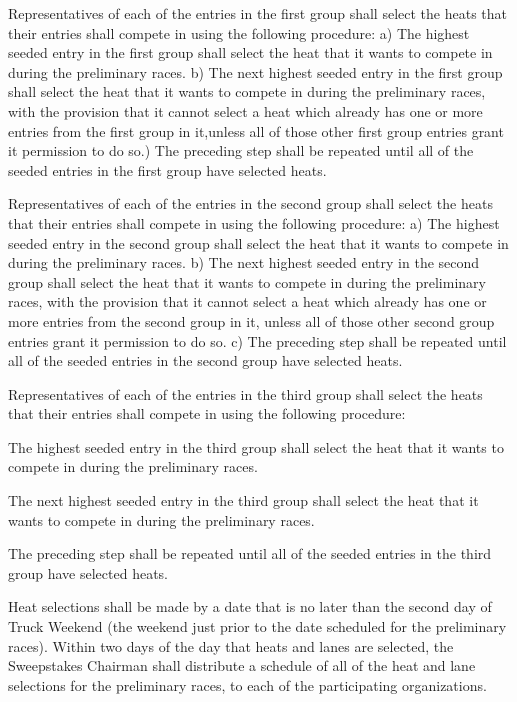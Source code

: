 \documentclass[openany]{book}
\begin{document}
Representatives of each of the entries in the first group shall select the heats that their entries shall compete in using the following procedure: a) The highest seeded entry in the first group shall select the heat that it wants to compete in during the preliminary races. b) The next highest seeded entry in the first group shall select the heat that it wants to compete in during the preliminary races, with the provision that it cannot select a heat which already has one or more entries from the first group in it,unless all of those other first group entries grant it permission to do so.) The preceding step shall be repeated until all of the seeded entries in the first group have selected heats.

Representatives of each of the entries in the second group shall select the heats that their entries shall compete in using the following procedure: a) The highest seeded entry in the second group shall select the heat that it wants to compete in during the preliminary races. b) The next highest seeded entry in the second group shall select the heat that it wants to compete in during the preliminary races, with the provision that it cannot select a heat which already has one or more entries from the second group in it, unless all of those other second group entries grant it permission to do so. c) The preceding step shall be repeated until all of the seeded entries in the second group have selected heats.

Representatives of each of the entries in the third group shall select the heats that their entries shall compete in using the following procedure:

The highest seeded entry in the third group shall select the heat that it wants to compete in during the preliminary races.

The next highest seeded entry in the third group shall select the heat that it wants to compete in during the preliminary races.

The preceding step shall be repeated until all of the seeded entries in the third group have selected heats.

Heat selections shall be made by a date that is no later than the second day of Truck Weekend (the weekend just prior to the date scheduled for the preliminary races). Within two days of the day that heats and lanes are selected, the Sweepstakes Chairman shall distribute a schedule of all of the heat and lane selections for the preliminary races, to each of the participating organizations.
\end{document}
